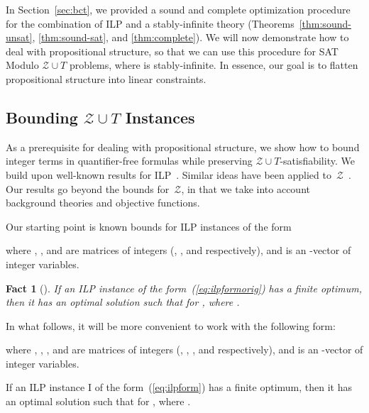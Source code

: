\documentclass{llncs}
\newcommand{\Z}[0]{\ensuremath{\mathcal{Z}}}
\newcommand{\ZT}[0]{\ensuremath{\mathcal{Z} \cup T}}
\newtheorem{fact}{Fact}
\begin{document}
In Section~\ref{sec:bct}, we provided a sound and complete
optimization procedure for the combination of ILP and a
stably-infinite theory (Theorems~\ref{thm:sound-unsat},
\ref{thm:sound-sat}, and \ref{thm:complete}). We will now demonstrate
how to deal with propositional structure, so that we can use this
procedure for SAT Modulo \ZT{} problems, where  is stably-infinite.
In essence, our goal is to flatten propositional structure into linear
constraints.

\subsection{Bounding \ZT{} Instances}

As a prerequisite for dealing with propositional structure, we show
how to bound integer terms in quantifier-free formulas while
preserving \ZT{}-satisfiability.  We build upon well-known results for
ILP~\cite{combopt}. Similar ideas have been applied
to~\Z{}~\cite{lauclid}. Our results go beyond the bounds for~\Z{}, in
that we take into account background theories and objective functions.

Our starting point is known bounds for ILP instances of the form

where , , and  are matrices of integers (, , and  respectively), and  is an
-vector of integer variables.

\begin{fact}[{\cite[Corollary of Theorem 13.5]{combopt}}]
  \label{lemma:pap}
  If an ILP instance of the form~(\ref{eq:ilpformorig}) has a finite
  optimum, then it has an optimal solution  such that  for , where .
\end{fact}

In what follows, it will be more convenient to work with the following
form:

where , , ,  and  are matrices of integers (, , ,  and 
respectively), and  is an -vector of integer variables.

\begin{lemma}
  If an ILP instance I of the form~(\ref{eq:ilpform}) has a finite
  optimum, then it has an optimal solution  such that
   for , where .
  \label{lemma:ilpbounds}
\end{lemma}
\end{document}
